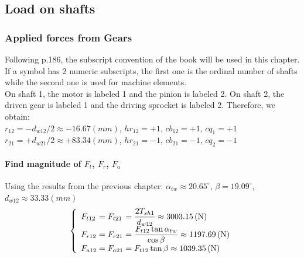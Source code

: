 \subsection{Load on shafts}
\subsubsection{Applied forces from Gears}
Following p.186, the subscript convention of the book will be used in this chapter. If a symbol has 2 numeric subscripts, the first one is the ordinal number of shafts while the second one is used for machine elements.\\
On shaft 1, the motor is labeled 1 and the pinion is labeled 2. On shaft 2, the driven gear is labeled 1 and the driving sprocket is labeled 2. Therefore, we obtain:\\
$ r_{12} = -d_{w12}/2 \approx -16.67\unit{(mm)}$, $ hr_{12} = +1 $, $ cb_{12} = +1 $, $ cq_1 = +1 $\\
$ r_{21} = +d_{w21}/2 \approx +83.34\unit{(mm)}$, $ hr_{21} = -1 $, $ cb_{21} = -1$, $ cq_2 = -1$
\paragraph{Find magnitude of $ F_{t} $, $ F_r $, $ F_a $}
Using the results from the previous chapter: $ \alpha_{tw} \approx 20.65^\circ $, $ \beta = 19.09^\circ $, $ d_{w12}\approx 33.33\unit{(mm)} $
\[
\left\{ 
\begin{array}{l@{{}={}}l@{{}={}}l}
F_{t12}& F_{t21}& \dfrac{2T_{sh1}}{d_{w12}}\approx 3003.15\unit{(N)}\\
F_{r12}& F_{r21}&  \dfrac{F_{t12}\tan\alpha_{tw}}{\cos\beta}\approx 1197.69 \unit{(N)}\\
F_{a12}& F_{a21}& F_{t12}\tan\beta\approx 1039.35 \unit{(N)}\\ 
\end{array}
\right.
\]
